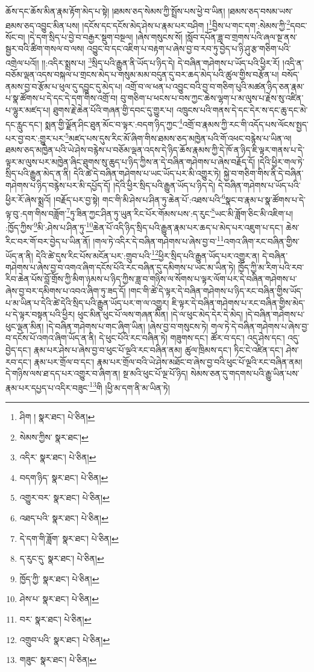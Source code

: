 ཆོས་དང་ཆོས་མིན་རྣམ་རྟོག་མེད་པ་སྟེ། །ཐམས་ཅད་སེམས་ཀྱི་སྤྲོས་པས་ཕྱེ་བ་ཡིན། །ཐམས་ཅད་བསམ་ཡས་ཐམས་ཅད་འབྱུང་མིན་པས། །དངོས་དང་དངོས་མེད་ཤེས་པ་རྣམ་པར་བཤིག །\footnote{ཤིག །  སྣར་ཐང་།  པེ་ཅིན། }བྱིས་པ་གང་དག་:སེམས་ཀྱི་\footnote{སེམས་ཀྱིས་  སྣར་ཐང་། }དབང་སོང་བ། །དེ་དག་སྲིད་པ་བྱེ་བ་བརྒྱར་སྡུག་བསྔལ། །ཞེས་གསུངས་སོ། །སློབ་དཔོན་ཟླ་བ་གྲགས་པའི་ཞལ་སྔ་ནས་སྦྱར་བའི་ཚིག་གསལ་བ་ལས། འབྱུང་བ་དང་འཇིག་པ་བརྟག་པ་ཞེས་བྱ་བ་རབ་ཏུ་བྱེད་པ་ཉི་ཤུ་རྩ་གཅིག་པའི་འགྲེལ་པའོ།། །།:འདིར་སྨྲས་པ། \footnote{འདིར་  སྣར་ཐང་།  པེ་ཅིན། }སྲིད་པའི་རྒྱུན་ནི་ཡོད་པ་ཉིད་དེ། དེ་བཞིན་གཤེགས་པ་ཡོད་པའི་ཕྱིར་རོ། །འདི་ན་བཅོམ་ལྡན་འདས་བསྐལ་པ་གྲངས་མེད་པ་གསུམ་མམ་བདུན་དུ་བར་ཆད་མེད་པའི་ཚུལ་གྱིས་བརྩོན་པ། བསོད་ནམས་བྱ་བ་རྩོམ་པ་ཕུལ་དུ་དབྱུང་དུ་མེད་པ། འགྲོ་བ་ལ་ཕན་པ་འབྱུང་བའི་བྱ་བ་གཅིག་པུའི་མཚན་ཉིད་ཅན་རྣམ་པ་སྣ་ཚོགས་པ་དེ་དང་དེ་དག་གིས་འགྲོ་བ། བུ་གཅིག་པ་ཕངས་པ་བས་ཀྱང་ཆེས་ལྷག་པ་མ་ལུས་པ་རྗེས་སུ་འཛིན་པ་ལྷུར་མཛད་པ། ཐུགས་རྗེ་ཆེན་པོའི་གཞན་གྱི་དབང་དུ་གྱུར་པ། འཁྲུངས་པའི་གནས་དེ་དང་དེར་ས་དང་ཆུ་དང་མེ་དང་རླུང་དང་། སྨན་གྱི་ལྗོན་ཤིང་ཐུན་མོང་བ་ལྟར་:བདག་ཉིད་ཀྱང་\footnote{བདག་ཉིད་  སྣར་ཐང་།  པེ་ཅིན། }འགྲོ་བ་རྣམས་ཀྱི་རང་གི་འདོད་པས་ལོངས་སྤྱད་པར་བྱ་བར་:གྱུར་པར་\footnote{འགྱུར་བར་  སྣར་ཐང་།  པེ་ཅིན། }མཛད་པས་དུས་རིང་མོ་ཞིག་གིས་ཐམས་ཅད་མཁྱེན་པའི་གོ་འཕང་བརྙེས་པ་ཡིན་ལ། ཐམས་ཅད་མཁྱེན་པའི་ཡེ་ཤེས་བརྙེས་པ་བཅོམ་ལྡན་འདས་དེ་ཉིད་ཆོས་རྣམས་ཀྱི་དེ་ཁོ་ན་ཉིད་ཇི་ལྟར་གནས་པ་དེ་ལྟར་མ་ལུས་པར་མཁྱེན་ཞིང་ཐུགས་སུ་ཆུད་པ་ཉིད་ཀྱིས་ན་དེ་བཞིན་གཤེགས་པ་ཞེས་བརྗོད་དོ། །དེའི་ཕྱིར་གལ་ཏེ་སྲིད་པའི་རྒྱུན་མེད་ན་ནི། དེའི་ཚེ་དེ་བཞིན་གཤེགས་པ་ཡང་ཡོད་པར་མི་འགྱུར་ཏེ། སྐྱེ་བ་གཅིག་གིས་ནི་དེ་བཞིན་གཤེགས་པ་ཉིད་བརྙེས་པར་མི་དཔྱོད་དོ། །དེའི་ཕྱིར་སྲིད་པའི་རྒྱུན་ཡོད་པ་ཉིད་དེ། དེ་བཞིན་གཤེགས་པ་ཡོད་པའི་ཕྱིར་རོ་ཞེས་སྨྲའོ། །བརྗོད་པར་བྱ་སྟེ། གང་གི་མི་ཤེས་པ་ཤིན་ཏུ་ཆེན་པོ་:འཐས་པའི་\footnote{འཐད་པའི་  སྣར་ཐང་།  པེ་ཅིན། }སྣང་བ་རྣམ་པ་སྣ་ཚོགས་པ་དེ་ལྟ་བུ་:དག་གིས་བཟློག་\footnote{དེ་དག་གི་ཟློག་  སྣར་ཐང་།  པེ་ཅིན། }ཏུ་ཟིན་ཀྱང་ཤིན་ཏུ་ཡུན་རིང་པོར་གོམས་པས་:ད་རུང་\footnote{ད་རུང་དུ་  སྣར་ཐང་།  པེ་ཅིན། }ཡང་མི་ཟློག་ཅིང་མི་འཇིག་པ། :ཁྱོད་ཀྱིས་\footnote{ཁྱོད་ཀྱི་  སྣར་ཐང་།  པེ་ཅིན། }མི་:ཤེས་པ་ཤིན་ཏུ་\footnote{ཤེས་པ་  སྣར་ཐང་།  པེ་ཅིན། }ཆེན་པོ་འདི་ཉིད་སྲིད་པའི་རྒྱུན་རྣམ་པར་ཆད་པ་མེད་པར་འཇུག་པ་དང་། ཆེས་རིང་བར་གོ་བར་བྱེད་པ་ཡིན་ནོ། །གལ་ཏེ་འདིར་དེ་བཞིན་གཤེགས་པ་ཞེས་བྱ་བ་\footnote{བར་  སྣར་ཐང་།  པེ་ཅིན། }འགའ་ཞིག་རང་བཞིན་གྱིས་ཡོད་ན་ནི། དེའི་ཚེ་དུས་རིང་པོས་མངོན་པར་:གྲུབ་པའི་\footnote{འགྲུབ་པའི་  སྣར་ཐང་།  པེ་ཅིན། }ཕྱིར་སྲིད་པའི་རྒྱུན་ཡོད་པར་འགྱུར་ན། དེ་བཞིན་གཤེགས་པ་ཞེས་བྱ་བ་འགའ་ཞིག་དངོས་པོའི་རང་བཞིན་དུ་དམིགས་པ་ཡང་མ་ཡིན་ཏེ། ཁྱོད་ཀྱི་མ་རིག་པའི་རབ་རིབ་ཆེན་པོས་བློ་གྲོས་ཀྱི་མིག་ཉམས་པ་ཉིད་ཀྱིས་ཟླ་བ་གཉིས་ལ་སོགས་པ་ལྟར་ལོག་པར་དེ་བཞིན་གཤེགས་པ་ཞེས་བྱ་བར་དམིགས་པ་འབའ་ཞིག་ཏུ་ཟད་དོ། །གང་གི་ཚེ་དེ་ལྟར་དེ་བཞིན་གཤེགས་པ་ཉིད་རང་བཞིན་གྱིས་ཡོད་པ་མ་ཡིན་པ་དེའི་ཚེ་དེའི་སྲིད་པའི་རྒྱུན་ཡོད་པར་ག་ལ་འགྱུར། ཇི་ལྟར་དེ་བཞིན་གཤེགས་པ་རང་བཞིན་གྱིས་མེད་པ་དེ་ལྟར་བསྟན་པའི་ཕྱིར། ཕུང་མིན་ཕུང་པོ་ལས་གཞན་མིན། །དེ་ལ་ཕུང་མེད་དེར་དེ་མེད། །དེ་བཞིན་གཤེགས་པ་ཕུང་ལྡན་མིན། །དེ་བཞིན་གཤེགས་པ་གང་ཞིག་ཡིན། །ཞེས་བྱ་བ་གསུངས་ཏེ། གལ་ཏེ་དེ་བཞིན་གཤེགས་པ་ཞེས་བྱ་བ་དངོས་པོ་འགའ་ཞིག་ཡོད་ན་ནི། དེ་ཕུང་པོའི་རང་བཞིན་ཏེ། གཟུགས་དང་། ཚོར་བ་དང་། འདུ་ཤེས་དང་། འདུ་བྱེད་དང་། རྣམ་པར་ཤེས་པ་ཞེས་བྱ་བ་ཕུང་པོ་ལྔའི་རང་བཞིན་ནམ། ཚུལ་ཁྲིམས་དང་། ཏིང་ངེ་འཛིན་དང་། ཤེས་རབ་དང་། རྣམ་པར་གྲོལ་བ་དང་། རྣམ་པར་གྲོལ་བའི་ཡེ་ཤེས་མཐོང་བ་ཞེས་བྱ་བའི་ཕུང་པོ་ལྔའི་རང་བཞིན་ནམ། དེ་གཉིས་ལས་ཐ་དད་པར་འགྱུར་བ་ཞིག་ན། སྔ་མའི་ཕུང་པོ་ལྔ་པོ་ཉིད། སེམས་ཅན་དུ་གདགས་པའི་རྒྱུ་ཡིན་པས་རྣམ་པར་དཔྱད་པ་འདིར་བཟུང་\footnote{གཟུང་  སྣར་ཐང་།  པེ་ཅིན། }གི །ཕྱི་མ་དག་ནི་མ་ཡིན་ཏེ། 